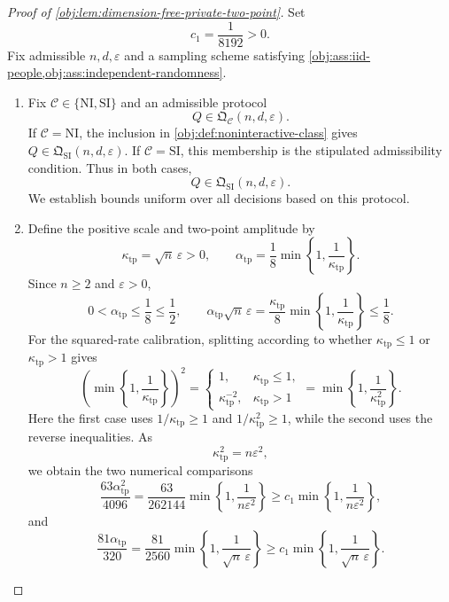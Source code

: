 \documentclass[11pt]{article}
\begin{document}
\begin{proof}[Proof of \cref{obj:lem:dimension-free-private-two-point}]
Set
\[
c_1=\frac{1}{8192}>0.
\]
Fix admissible \(n,d,\varepsilon\) and a sampling scheme satisfying
\cref{obj:ass:iid-people,obj:ass:independent-randomness}.

\begin{enumerate}
\item Fix \(\mathcal C\in\{\mathrm{NI},\mathrm{SI}\}\) and an admissible protocol
\[
Q\in\mathfrak Q_{\mathcal C}(n,d,\varepsilon).
\]
If \(\mathcal C=\mathrm{NI}\), the inclusion in
\cref{obj:def:noninteractive-class} gives
\(Q\in\mathfrak Q_{\mathrm{SI}}(n,d,\varepsilon)\).
If \(\mathcal C=\mathrm{SI}\), this membership is the stipulated admissibility condition. Thus in both cases,
\[
Q\in\mathfrak Q_{\mathrm{SI}}(n,d,\varepsilon).
\]
We establish bounds uniform over all decisions based on this protocol.

\item Define the positive scale and two-point amplitude by
\[
\kappa_{\mathrm{tp}}=\sqrt n\,\varepsilon>0,
\qquad
\alpha_{\mathrm{tp}}
=\frac18\min\left\{1,\frac1{\kappa_{\mathrm{tp}}}\right\}.
\]
Since \(n\ge2\) and \(\varepsilon>0\),
\[
0<\alpha_{\mathrm{tp}}\le\frac18\le\frac12,
\qquad
\alpha_{\mathrm{tp}}\sqrt n\,\varepsilon
=\frac{\kappa_{\mathrm{tp}}}{8}
  \min\left\{1,\frac1{\kappa_{\mathrm{tp}}}\right\}
\le\frac18.
\]
For the squared-rate calibration, splitting according to whether
\(\kappa_{\mathrm{tp}}\le1\) or \(\kappa_{\mathrm{tp}}>1\) gives
\[
\left(\min\left\{1,\frac1{\kappa_{\mathrm{tp}}}\right\}\right)^2
=
\begin{cases}
1,&\kappa_{\mathrm{tp}}\le1,\\
\kappa_{\mathrm{tp}}^{-2},&\kappa_{\mathrm{tp}}>1
\end{cases}
=
\min\left\{1,\frac1{\kappa_{\mathrm{tp}}^2}\right\}.
\]
Here the first case uses
\(1/\kappa_{\mathrm{tp}}\ge1\) and
\(1/\kappa_{\mathrm{tp}}^2\ge1\), while the second uses the reverse inequalities.
As
\[
\kappa_{\mathrm{tp}}^2=n\varepsilon^2,
\]
we obtain the two numerical comparisons
\[
\frac{63\alpha_{\mathrm{tp}}^2}{4096}
=
\frac{63}{262144}\min\left\{1,\frac1{n\varepsilon^2}\right\}
\ge
c_1\min\left\{1,\frac1{n\varepsilon^2}\right\},
\]
and
\[
\frac{81\alpha_{\mathrm{tp}}}{320}
=
\frac{81}{2560}\min\left\{1,\frac1{\sqrt n\,\varepsilon}\right\}
\ge
c_1\min\left\{1,\frac1{\sqrt n\,\varepsilon}\right\}.
\]


\end{enumerate}
\end{proof}
\end{document}
